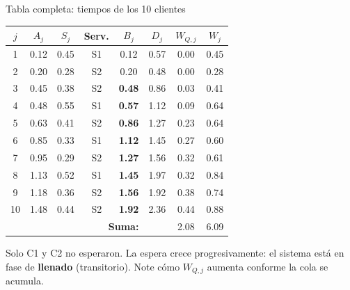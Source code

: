 \documentclass[aspectratio=1610, 9pt]{beamer}
\begin{document}
\begin{frame}{Tabla completa: tiempos de los 10 clientes}

\begin{center}
\renewcommand{\arraystretch}{1.15}
\small
\begin{tabular}{c c c c c c c c}
\toprule
$j$ & $A_j$ & $S_j$ & \textbf{Serv.} & $B_j$ & $D_j$ & $W_{Q,j}$ & $W_j$ \\
\midrule
1 & 0.12 & 0.45 & S1 & 0.12 & 0.57 & \cellcolor{green!12}0.00 & 0.45 \\
2 & 0.20 & 0.28 & S2 & 0.20 & 0.48 & \cellcolor{green!12}0.00 & 0.28 \\
3 & 0.45 & 0.38 & S2 & \textbf{0.48} & 0.86 & \cellcolor{orange!15}0.03 & 0.41 \\
4 & 0.48 & 0.55 & S1 & \textbf{0.57} & 1.12 & \cellcolor{orange!15}0.09 & 0.64 \\
5 & 0.63 & 0.41 & S2 & \textbf{0.86} & 1.27 & \cellcolor{orange!20}0.23 & 0.64 \\
6 & 0.85 & 0.33 & S1 & \textbf{1.12} & 1.45 & \cellcolor{orange!20}0.27 & 0.60 \\
7 & 0.95 & 0.29 & S2 & \textbf{1.27} & 1.56 & \cellcolor{red!15}0.32 & 0.61 \\
8 & 1.13 & 0.52 & S1 & \textbf{1.45} & 1.97 & \cellcolor{red!15}0.32 & 0.84 \\
9 & 1.18 & 0.36 & S2 & \textbf{1.56} & 1.92 & \cellcolor{red!20}0.38 & 0.74 \\
10 & 1.48 & 0.44 & S2 & \textbf{1.92} & 2.36 & \cellcolor{red!20}0.44 & 0.88 \\
\midrule
\multicolumn{5}{r}{\textbf{Suma:}} & & 2.08 & 6.09 \\
\bottomrule
\end{tabular}
\end{center}

\vspace{0.15cm}
\small
Solo C1 y C2 no esperaron. La espera crece progresivamente: el sistema est\'{a} en fase de \textbf{llenado} (transitorio). Note c\'{o}mo $W_{Q,j}$ aumenta conforme la cola se acumula.
\end{frame}
\end{document}
